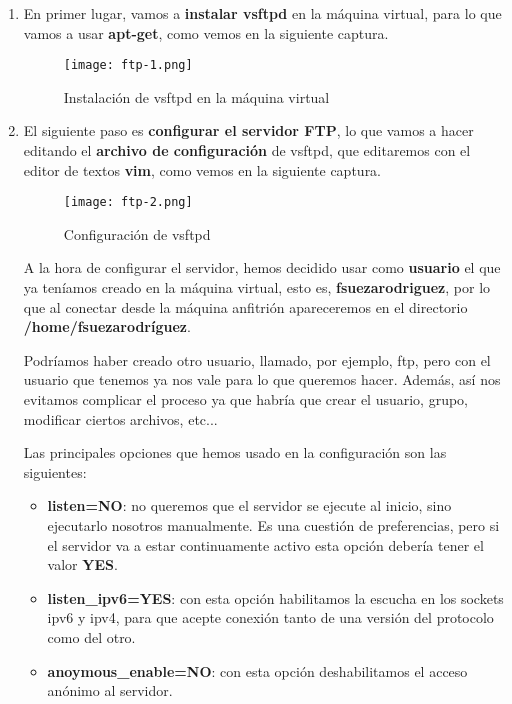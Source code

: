 \begin{enumerate}
    \item En primer lugar, vamos a \textbf{instalar vsftpd} en la máquina virtual, para lo que vamos a usar \textbf{apt-get}, como vemos en la siguiente captura.

    \begin{figure}[H]
        \centering
        \texttt{[image: ftp-1.png]}
        \caption{Instalación de vsftpd en la máquina virtual}
    \end{figure}

    \item El siguiente paso es \textbf{configurar el servidor FTP}, lo que vamos a hacer editando el \textbf{archivo de configuración} de vsftpd, que editaremos con el editor de textos \textbf{vim}, como vemos en la siguiente captura.

    \begin{figure}[H]
        \centering
        \texttt{[image: ftp-2.png]}
        \caption{Configuración de vsftpd}
    \end{figure}

    A la hora de configurar el servidor, hemos decidido usar como \textbf{usuario} el que ya teníamos creado en la máquina virtual, esto es, \textbf{fsuezarodriguez}, por lo que al conectar desde la máquina anfitrión apareceremos en el directorio \textbf{/home/fsuezarodríguez}.

    Podríamos haber creado otro usuario, llamado, por ejemplo, ftp, pero con el usuario que tenemos ya nos vale para lo que queremos hacer. Además, así nos evitamos complicar el proceso ya que habría que crear el usuario, grupo, modificar ciertos archivos, etc...

    Las principales opciones que hemos usado en la configuración son las siguientes:
    \begin{itemize}
        \item \textbf{listen=NO}: no queremos que el servidor se ejecute al inicio, sino ejecutarlo nosotros manualmente. Es una cuestión de preferencias, pero si el servidor va a estar continuamente activo esta opción debería tener el valor \textbf{YES}.

        \item \textbf{listen\_ipv6=YES}: con esta opción habilitamos la escucha en los sockets ipv6 y ipv4, para que acepte conexión tanto de una versión del protocolo como del otro.

        \item \textbf{anoymous\_enable=NO}: con esta opción deshabilitamos el acceso anónimo al servidor.


\end{itemize}
\end{enumerate}
